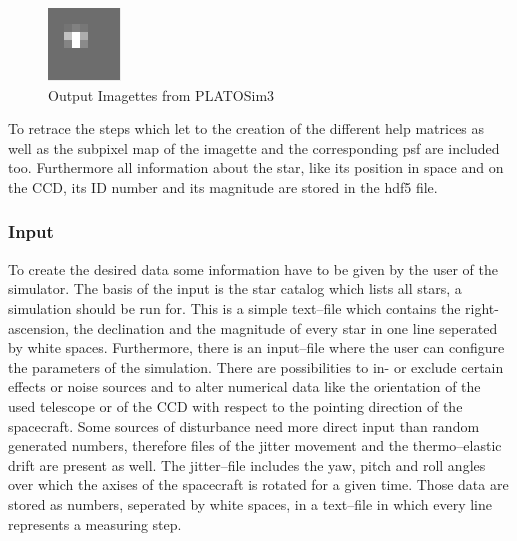 \begin{figure}[!htb]
\endminipage\hfill
{}%
  \includegraphics[width=\linewidth]{Imagette3.JPG}
\endminipage
\centering
\caption{Output Imagettes from PLATOSim3}\label{fig:imagettes}
\end{figure}

To retrace the steps which let to the creation of the different help matrices as well as the subpixel map of the imagette and the corresponding psf are included too. Furthermore all information about the star, like its position in space and on the CCD, its ID number and its magnitude are stored in the hdf5 file.
\subsubsection{Input}
To create the desired data some information have to be given by the user of the simulator. The basis of the input is the star catalog which lists all stars, a simulation should be run for. This is a simple text--file which contains the right-ascension, the declination and the magnitude of every star in one line seperated by white spaces. Furthermore, there is an input--file where the user can configure the parameters of the simulation. There are possibilities to in- or exclude certain effects or noise sources and to alter numerical data like the orientation of the used telescope or of the CCD with respect to the pointing direction of the spacecraft. Some sources of disturbance need more direct input than random generated numbers, therefore files of the jitter movement and the thermo--elastic drift are present as well. The jitter--file includes the yaw, pitch and roll angles over which the axises of the spacecraft is rotated for a given time. Those data are stored as numbers, seperated by white spaces, in a text--file in which every line represents a measuring step.    
